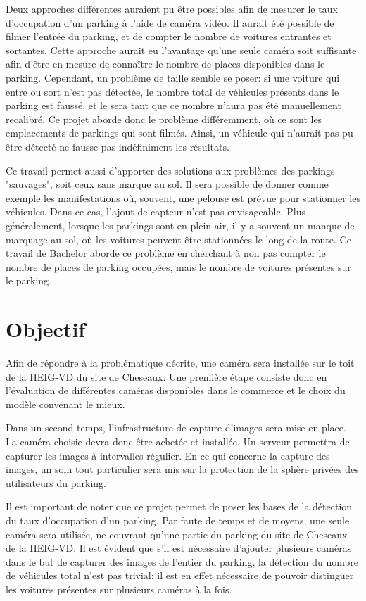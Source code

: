Deux approches différentes auraient pu être possibles afin de mesurer le taux d'occupation d'un parking à l'aide de caméra vidéo. Il aurait été possible de filmer l'entrée du parking, et de compter le nombre de voitures entrantes et sortantes. Cette approche aurait eu l'avantage qu'une seule caméra soit suffisante afin d'être en mesure de connaître le nombre de places disponibles dans le parking. Cependant, un problème de taille semble se poser: si une voiture qui entre ou sort n'est pas détectée, le nombre total de véhicules présents dans le parking est faussé, et le sera tant que ce nombre n'aura pas été manuellement recalibré. Ce projet aborde donc le problème différemment, où ce sont les emplacements de parkings qui sont filmés. Ainsi, un véhicule qui n'aurait pas pu être détecté ne fausse pas indéfiniment les résultats.

Ce travail permet aussi d'apporter des solutions aux problèmes des parkings "sauvages", soit ceux sans marque au sol. Il sera possible de donner comme exemple les manifestations où, souvent, une pelouse est prévue pour stationner les véhicules. Dans ce cas, l'ajout de capteur n'est pas envisageable. Plus généralement, lorsque les parkings sont en plein air, il y a souvent un manque de marquage au sol, où les voitures peuvent être stationnées le long de la route. Ce travail de Bachelor aborde ce problème en cherchant à non pas compter le nombre de places de parking occupées, mais le nombre de voitures présentes sur le parking. 

\section{Objectif}
Afin de répondre à la problématique décrite, une caméra sera installée sur le toit de la HEIG-VD du site de Cheseaux. Une première étape consiste donc en l'évaluation de différentes caméras disponibles dans le commerce et le choix du modèle convenant le mieux. 

Dans un second temps, l'infrastructure de capture d'images sera mise en place. La caméra choisie devra donc être achetée et installée. Un serveur permettra de capturer les images à intervalles régulier. En ce qui concerne la capture des images, un soin tout particulier sera mis sur la protection de la sphère privées des utilisateurs du parking.

Il est important de noter que ce projet permet de poser les bases de la détection du taux d'occupation d'un parking. Par faute de temps et de moyens, une seule caméra sera utilisée, ne couvrant qu'une partie du parking du site de Cheseaux de la HEIG-VD. Il est évident que s'il est nécessaire d'ajouter plusieurs caméras dans le but de capturer des images de l'entier du parking, la détection du nombre de véhicules total n'est pas trivial: il est en effet nécessaire de pouvoir distinguer les voitures présentes sur plusieurs caméras à la fois. 

